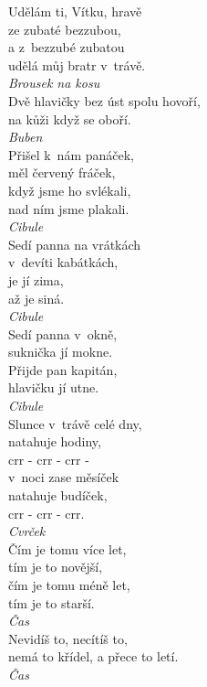 \begin{multicols}{3}
\noindent
Udělám ti, Vítku, hravě\\
ze zubaté bezzubou,\\
a z~bezzubé zubatou\\
udělá můj bratr v~trávě.\\[1 mm]
{\sl Brousek na kosu}\\

\noindent
Dvě hlavičky bez úst spolu hovoří,\\
na kůži když se oboří.\\[1 mm]
{\sl Buben}\\

\noindent
Přišel k~nám panáček,\\
měl červený fráček,\\
když jsme ho svlékali,\\
nad ním jsme plakali.\\[1 mm]
{\sl Cibule}\\

\noindent
Sedí panna na vrátkách\\
v~devíti kabátkách,\\
je jí zima,\\
až je siná.\\[1 mm]
{\sl Cibule}\\

\noindent
Sedí panna v~okně,\\
suknička jí mokne.\\
Přijde pan kapitán,\\
hlavičku jí utne.\\[1 mm]
{\sl Cibule}\\

\noindent
Slunce v~trávě celé dny,\\
natahuje hodiny,\\
crr - crr - crr -\\
v~noci zase měsíček\\
natahuje budíček,\\
crr - crr - crr.\\[1 mm]
{\sl Cvrček}\\

\noindent
Čím je tomu více let,\\
tím je to novější,\\
čím je tomu méně let,\\
tím je to starší.\\[1 mm]
{\sl Čas}\\

\noindent
Nevidíš to, necítíš to,\\
nemá to křídel, a přece to letí.\\[1 mm]
{\sl Čas}\\


\end{multicols}

